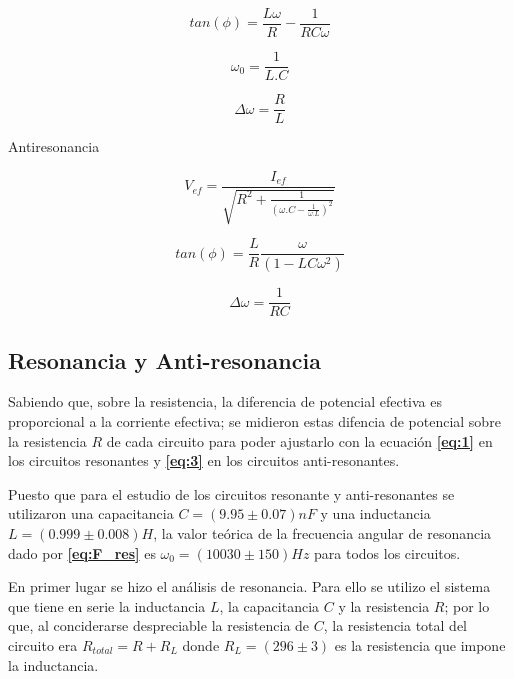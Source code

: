 \documentclass[11pt,a4paper]{article}
\begin{document}
\begin{equation}
tan(\phi) = \frac{L\omega}{R} - \frac{1}{RC\omega} 
\label{eq:2}
\end{equation}

\begin{equation}
\omega_{0}= \frac{1}{L.C}
\label{eq:F_res}
\end{equation}

\begin{equation}
\Delta\omega = \frac{R}{L}
\label{deltaomega}
\end{equation}

Antiresonancia

\begin{equation}
V_{ef} = \frac{I_{ef}}{\sqrt{R^2 + \frac{1}{(\omega.C - \frac{1}{\omega.L})^2}}}
\label{eq:3}
\end{equation}

\begin{equation}
tan(\phi) = \frac{L}{R}\frac{\omega}{(1- LC\omega^2)} 
\label{eq:4}
\end{equation}

\begin{equation}
\Delta\omega = \frac{1}{RC}
\label{deltaomega2}
\end{equation}




\subsection{Resonancia y Anti-resonancia}

Sabiendo que, sobre la resistencia, la diferencia de potencial efectiva es proporcional a la corriente efectiva; se midieron estas difencia de potencial sobre la resistencia $R$ de cada circuito para poder ajustarlo con la ecuación \textbf{\eqref{eq:1}} en los circuitos resonantes y \textbf{\eqref{eq:3}} en los circuitos anti-resonantes.  

Puesto que para el estudio de los circuitos resonante y anti-resonantes se utilizaron una capacitancia $C= (9.95 \pm 0.07)nF$ y una inductancia $L= (0.999 \pm 0.008) H$, la valor teórica de la frecuencia angular de resonancia dado por \textbf{\eqref{eq:F_res}} es $\omega_{0}=(10030 \pm 150) Hz$ para todos los circuitos.

En primer lugar se hizo el análisis de resonancia. Para ello se utilizo el sistema que tiene en serie la inductancia $L$, la capacitancia $C$ y la resistencia $R$; por lo que, al conciderarse despreciable la resistencia de $C$, la resistencia total del circuito era $R_{total} = R+R_{L}$ donde $R_{L} = (296 \pm 3)$ es la resistencia que impone la inductancia.
\end{document}
